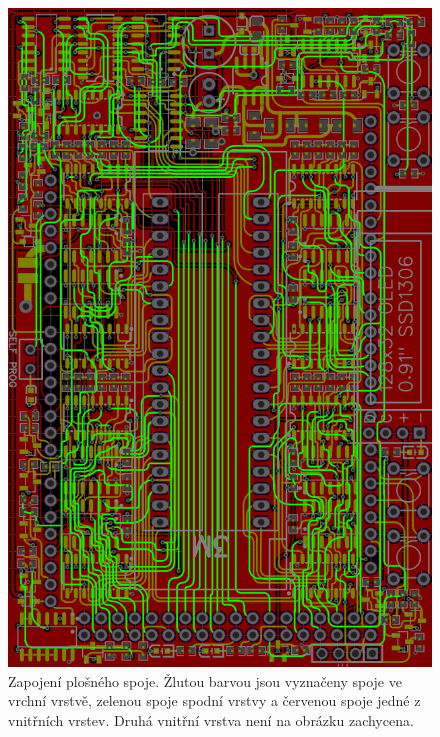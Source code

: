 \documentclass[11pt,a4paper,twoside,openright]{report}
\begin{document}
\begin{figure}[ht!]
  \includegraphics[width=\linewidth]{img/board.png}
  \centering
  \caption{Zapojení plošného spoje. Žlutou barvou jsou vyznačeny spoje ve vrchní vrstvě, zelenou spoje spodní vrstvy a červenou spoje jedné z vnitřních vrstev. Druhá vnitřní vrstva není na obrázku zachycena.}
  \label{appendix:board}
\end{figure}
\end{document}
